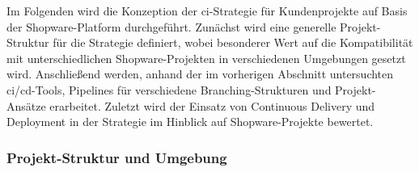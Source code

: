 Im Folgenden wird die Konzeption der \acrshort{ci}-Strategie für Kundenprojekte auf Basis der Shopware-Platform
durchgeführt.
Zunächst wird eine generelle Projekt-Struktur für die Strategie definiert, wobei besonderer Wert auf die
Kompatibilität mit unterschiedlichen Shopware-Projekten in verschiedenen Umgebungen gesetzt wird.
Anschließend werden, anhand der im vorherigen Abschnitt untersuchten \acrshort{ci}/\acrshort{cd}-Tools, Pipelines für
verschiedene Branching-Strukturen und Projekt-Ansätze erarbeitet.
Zuletzt wird der Einsatz von Continuous Delivery und Deployment in der Strategie im Hinblick auf Shopware-Projekte
bewertet.

\subsubsection{Projekt-Struktur und Umgebung}

